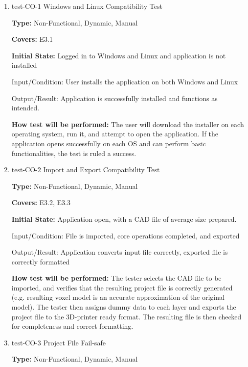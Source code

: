 \documentclass[12pt, titlepage]{article}
\begin{document}
\begin{enumerate}

\item{test-CO-1 Windows and Linux Compatibility Test\\}
\label{sec:t-nf-10}

\textbf{Type:} Non-Functional, Dynamic, Manual

\textbf{Covers:} E3.1
					
\textbf{Initial State:} Logged in to Windows and Linux and application is not installed
					
Input/Condition: User installs the application on both Windows and Linux
					
Output/Result: Application is successfully installed and functions as intended.
					
\textbf{How test will be performed:} The user will download the installer on each operating system, run it, and attempt to open the
application. If the application opens successfully on each OS and can perform basic functionalities, the test is ruled a success.
					
\item{test-CO-2 Import and Export Compatibility Test\\}
\label{sec:t-nf-11}

\textbf{Type:} Non-Functional, Dynamic, Manual

\textbf{Covers:} E3.2, E3.3
					
\textbf{Initial State:} Application open, with a CAD file of average size prepared.
					
Input/Condition: File is imported, core operations completed, and exported
					
Output/Result: Application converts input file correctly, exported file is correctly formatted
					
\textbf{How test will be performed:} The tester selects the CAD file to be imported, and verifies that the resulting project file 
is correctly generated (e.g. resulting voxel model is an accurate approximation of the original model). The tester then assigns 
dummy data to each layer and exports the project file to the 3D-printer ready format. The resulting file is then checked for
completeness and correct formatting. 

\item{test-CO-3 Project File Fail-safe\\} 
\label{sec:t-nf-12}

\textbf{Type:} Non-Functional, Dynamic, Manual


\end{enumerate}
\end{document}
